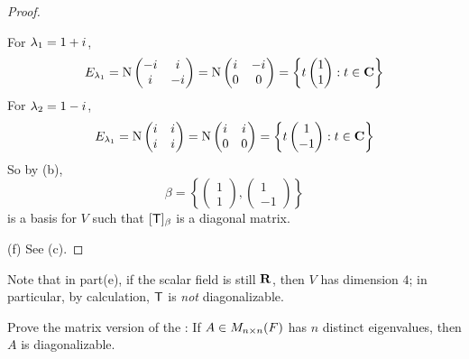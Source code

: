 \begin{proof}
\begin{enumerate}
For \(\lambda_1 = 1 + {i\mkern1mu}\),
\[
    E_{\lambda_1} = \mathrm{N} \begin{pmatrix}
        -{i\mkern1mu} & {i\mkern1mu} \\ {i\mkern1mu} & -{i\mkern1mu}
    \end{pmatrix} = \mathrm{N} \begin{pmatrix}
        {i\mkern1mu} & -{i\mkern1mu} \\ 0 & 0
    \end{pmatrix} = \left\{
        t \begin{pmatrix}
            1 \\ 1
        \end{pmatrix} : t \in \mathbf{C}
    \right\}
\]
For \(\lambda_2 = 1 - {i\mkern1mu}\),
\[
    E_{\lambda_1} = \mathrm{N} \begin{pmatrix}
        {i\mkern1mu} & {i\mkern1mu} \\ {i\mkern1mu} & {i\mkern1mu}
    \end{pmatrix} = \mathrm{N} \begin{pmatrix}
        {i\mkern1mu} & {i\mkern1mu} \\ 0 & 0
    \end{pmatrix} = \left\{
        t \begin{pmatrix}
            1 \\ -1
        \end{pmatrix} : t \in \mathbf{C}
    \right\}
\]
So by (b),
\[
    \beta = \left\{
        \begin{pmatrix} 1 \\ 1 \end{pmatrix},
        \begin{pmatrix} 1 \\ -1 \end{pmatrix}
    \right\}
\]
is a basis for \(V\) such that \([\textsf{T}]_{\beta}\) is a diagonal matrix.
\end{enumerate}

(f) See (c).
\end{proof}

\begin{remark} \label{remark 5.2.9}
Note that in part(e), if the scalar field is still \(\mathbf{R}\), then \(V\) has dimension \(4\);
in particular, by calculation, \(\textsf{T}\) is \emph{not} diagonalizable.
\end{remark}

\begin{exercise} \label{exercise 5.2.4}
Prove the matrix version of the :
If \(A \in M_{n \times n}(F)\) has \(n\) distinct eigenvalues, then \(A\) is diagonalizable.
\end{exercise}

